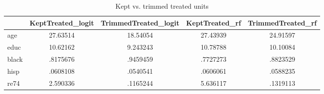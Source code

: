 \begin{table}[htbp]\centering
\caption{Kept vs. trimmed treated units}
\begin{tabular}{l*{4}{c}}
\hline\hline
            &KeptTreated\_logit&TrimmedTreated\_logit&KeptTreated\_rf&TrimmedTreated\_rf\\
\hline
age         &    27.63514&    18.54054&    27.43939&    24.91597\\
educ        &    10.62162&    9.243243&    10.78788&    10.10084\\
black       &    .8175676&    .9459459&    .7727273&    .8823529\\
hisp        &    .0608108&    .0540541&    .0606061&    .0588235\\
re74        &    2.590336&    .1165244&    5.636117&    .1319113\\
\hline\hline
\end{tabular}
\end{table}
